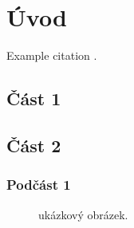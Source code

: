 \documentclass[12pt]{article} %
\begin{document}
\newpage %


\section{Úvod} %

Example citation \cite{Figueredo:2009dg}.


\subsection{Část 1} %

\lipsum[1] %


\subsection{Část 2} %

\lipsum[2] %


\subsubsection{Podčást 1} %

\lipsum[3] %

\begin{figure}[H] %
\caption{ukázkový obrázek.}
\label{fig:speciation}
\end{figure}

\end{document}
